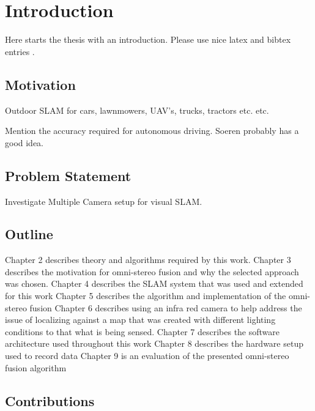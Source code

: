 \chapter{Introduction}
\label{chapter:Introduction}

Here starts the thesis with an introduction. Please use nice latex and bibtex entries \cite{latex}. 

\section{Motivation}

Outdoor SLAM for cars, lawnmowers, UAV's, trucks, tractors etc. etc.

Mention the accuracy required for autonomous driving.  Soeren probably has a good idea.

\section{Problem Statement}

Investigate Multiple Camera setup for visual SLAM.

\section{Outline}
 
Chapter 2 describes theory and algorithms required by this work.  \newline
Chapter 3 describes the motivation for omni-stereo fusion and why the selected approach was chosen.
\newline
Chapter 4 describes the SLAM system that was used and extended for this work \newline
Chapter 5 describes the algorithm and implementation of the omni-stereo fusion \newline
Chapter 6 describes using an infra red camera to help address the issue of localizing against a map
that was created with different lighting conditions to that what is being sensed.\newline
Chapter 7 describes the software architecture used throughout this work \newline
Chapter 8 describes the hardware setup used to record data \newline
Chapter 9 is an evaluation of the presented omni-stereo fusion algorithm \newline

\section{Contributions}
